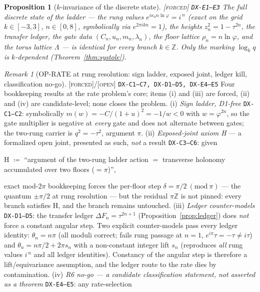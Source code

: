 \documentclass[11pt]{article}
\newcommand{\tagF}{\textcolor{cF}{\textsc{[forced]}}}
\newcommand{\tagO}{\textcolor{cO}{\textsc{[open]}}}
\newcommand{\hx}[1]{\textcolor{cC}{\footnotesize\texttt{#1}}}
\newcommand{\Z}{\mathbb{Z}}
\newcommand{\gp}{\varphi}
\theoremstyle{plain}
\newtheorem{proposition}[theorem]{Proposition}
\theoremstyle{definition}
\theoremstyle{remark}
\newtheorem{remark}[theorem]{Remark}
\begin{document}
\begin{proposition}[$k$-invariance of the discrete state]\label{prop:kinv}\tagF{} \hx{DX-E1--E3}
The full discrete state of the ladder --- the rung values
$e^{i\kappa_kn\ln\gp}=i^{\,n}$ (exact on the grid $k\in[-3,3]$,
$n\in[0,8]$, symbolically via $e^{2\pi ikn}=1$), the heights
$z_n^2=1-\tau^{2n}$, the transfer ledger, the gate data
$(C_n,u_n,m_n,\lambda_n)$, the floor lattice $\rho_n=n\ln\gp$, and the
torus lattice $\Lambda$ --- is \emph{identical for every branch} $k\in\Z$.
Only the marking $\log_kq$ is $k$-dependent (Theorem~\ref{thm:systole}).
\end{proposition}

\begin{remark}[OP-RATE at rung resolution: sign ladder, exposed joint, ledger kill, classification no-go]\label{rem:oprate}\tagF{}/\tagO{} \hx{DX-C1--C7, DX-D1--D5, DX-E4--E5}
Four bookkeeping results at the rate problem's core; items (i) and (iii)
are forced, (ii) and (iv) are candidate-level; none closes the problem.
(i) \emph{Sign ladder, D1-free} \hx{DX-C1--C2}: symbolically
$m(w)=-C/(1+u)^2=-1/w<0$ with $w=\gp^{2n}$, so the gate multiplier is
negative at \emph{every} gate and does not alternate between gates; the
two-rung carrier is $q^2=-\tau^2$, argument $\pi$. (ii) \emph{Exposed-joint
axiom H} --- a formalized open joint, presented as such, \emph{not} a
result \hx{DX-C3--C6}: given
\begin{center}
H $\coloneqq$ ``argument of the two-rung ladder action $=$ transverse
holonomy accumulated over two floors ($=\pi$)'',
\end{center}
exact mod-$2\pi$ bookkeeping forces the per-floor step
$\delta=\pi/2\ (\mathrm{mod}\ \pi)$ --- the quantum $\pm\pi/2$ at rung
resolution --- but the residual $\pi\Z$ is not pinned: every branch
satisfies H, and the branch remains untouched. (iii) \emph{Ledger
counter-models} \hx{DX-D1--D5}: the transfer ledger
$\Delta F_n=\tau^{2n+1}$ (Proposition~\ref{prop:ledger}) does \emph{not}
force a constant angular step. Two explicit counter-models pass every
ledger identity: $\theta_n=n\pi$ (all moduli correct; fails rung passage
at $n=1$, $e^{i\pi}\tau=-\tau\neq i\tau$) and $\theta_n=n\pi/2+2\pi s_n$
with a non-constant integer lift $s_n$ (reproduces \emph{all} rung values
$i^{\,n}$ and all ledger identities). Constancy of the angular step is
therefore a lift/equivariance assumption, and the ledger route to the rate
dies by contamination. (iv) \emph{R6 no-go --- a candidate classification
statement, not asserted as a theorem} \hx{DX-E4--E5}: any rate-selection

\end{remark}
\end{document}
